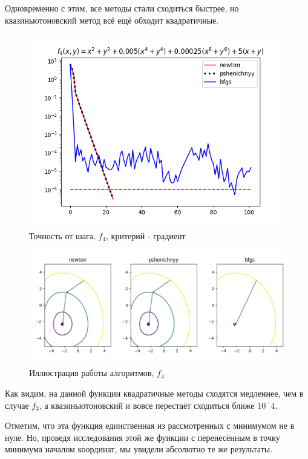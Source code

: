 Одновременно с этим, все методы стали сходиться быстрее, но квазиньютоновский метод всё ещё обходит квадратичные.

\begin{figure}[H]
			\centering
			\includegraphics[scale=0.75]{figures/acc_from_step_func4}
			\caption{Точность от шага, $f_4$, критерий - градиент}
			\label{fig:acc_from_step_func4}
\end{figure}

\begin{figure}[H]
			\centering
			\includegraphics[scale=0.75]{figures/process_view_func4}
			\caption{Иллюстрация работы алгоритмов, $f_4$}
			\label{fig:process_view_func4}
\end{figure}

Как видим, на данной функции квадратичные методы сходятся медленнее, чем в случае $f_3$, а квазиньютоновский и вовсе перестаёт сходиться ближе $10^-4$.

Отметим, что эта функция единственная из рассмотренных с минимумом не в нуле.
Но, проведя исследования этой же функции с перенесённым в точку минимума началом координат, мы увидели абсолютно те же результаты.

